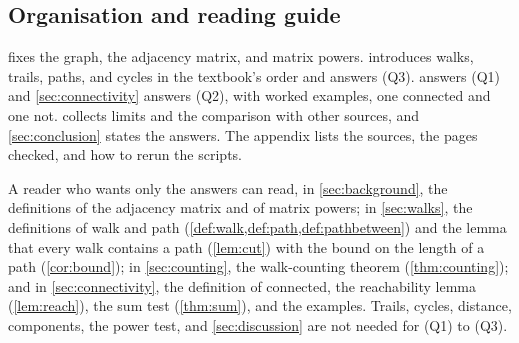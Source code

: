 \subsection{Organisation and reading guide}

 fixes the graph, the adjacency matrix, and matrix
powers.  introduces walks, trails, paths, and cycles in the
textbook's order and answers (Q3).  answers (Q1) and
\cref{sec:connectivity} answers (Q2), with worked examples, one connected
and one not.  collects limits and the comparison with
other sources, and \cref{sec:conclusion} states the answers. The appendix
lists the sources, the pages checked, and how to rerun the scripts.

A reader who wants only the answers can read, in \cref{sec:background}, the
definitions of the adjacency matrix and of matrix powers; in
\cref{sec:walks}, the definitions of walk and path (\cref{def:walk,def:path,def:pathbetween})
and the lemma that every walk contains a path (\cref{lem:cut}) with the
bound on the length of a path (\cref{cor:bound}); in \cref{sec:counting},
the walk-counting theorem (\cref{thm:counting}); and in
\cref{sec:connectivity}, the definition of connected, the reachability
lemma (\cref{lem:reach}), the sum test (\cref{thm:sum}), and the examples. Trails, cycles, distance, components, the power
test, and \cref{sec:discussion} are not needed for (Q1) to (Q3).
